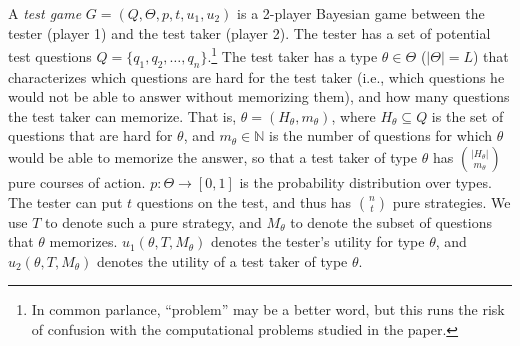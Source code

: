 \documentclass{article}
\begin{document}
A \emph{test game} $G = (Q, \Theta, p, t, u_1, u_2)$ is a 2-player
Bayesian game
between the tester (player 1) and the test taker (player 2). 
The tester has a set of potential test
questions $Q = \{q_1, q_2, \ldots, q_n\}$.\footnote{In common parlance,
  ``problem'' may be a better word, but this runs the risk of confusion
  with the computational problems studied in the paper.}
  The test taker has a type
$\theta \in \Theta$ ($|\Theta| = L$) that characterizes which questions
are hard for the test taker
 (i.e., which questions he would
not be able to answer without memorizing them), and how many questions the test
taker can memorize.  That is, $\theta = (H_\theta, m_\theta)$, where
$H_\theta \subseteq Q$ is the set of questions that are hard for $\theta$,
and $m_\theta \in \mathbb N$ is the number of questions for which $\theta$
would be able to memorize the answer, so that a test taker of type $\theta$
has $|H_\theta| \choose m_\theta$ pure courses of action.
$p: \Theta \rightarrow [0,1]$ is the
probability distribution over types.
The tester can put $t$ questions on the test, and thus has $n \choose t$
pure strategies.  We use $T$ to denote such a pure strategy, and $M_\theta$
to denote the subset of questions that $\theta$ memorizes.  $u_1(\theta, T,
M_\theta)$ denotes the tester's utility for type $\theta$, and $u_2(\theta,
T, M_\theta)$ denotes the utility of a test taker of type $\theta$.
\end{document}

